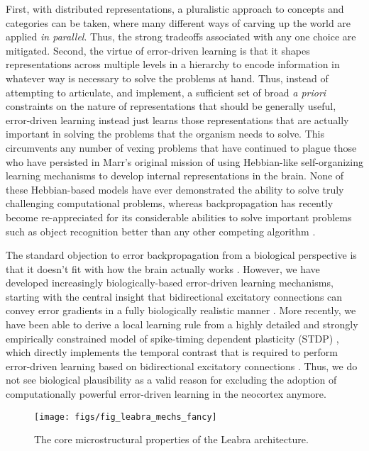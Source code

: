 \documentclass[11pt,twoside]{article}
\newif\myifpdf
\begin{document}
First, with distributed representations, a pluralistic approach to concepts and categories can be taken, where many different ways of carving up the world are applied {\em in parallel}.  Thus, the strong tradeoffs associated with any one choice are mitigated.  Second, the virtue of error-driven learning is that it shapes representations across multiple levels in a hierarchy to encode information in whatever way is necessary to solve the problems at hand.  Thus, instead of attempting to articulate, and implement, a sufficient set of broad {\em a priori} constraints on the nature of representations that should be generally useful, error-driven learning instead just learns those representations that are actually important in solving the problems that the organism needs to solve.  This circumvents any number of vexing problems that have continued to plague those who have persisted in Marr's original mission of using Hebbian-like self-organizing learning mechanisms to develop internal representations in the brain.  None of these Hebbian-based models have ever demonstrated the ability to solve truly challenging computational problems, whereas backpropagation has recently become re-appreciated for its considerable abilities to solve important problems such as object recognition better than any other competing algorithm \cite[e.g.,]{CiresanMeierGambardellaEtAl10,CiresanMeierSchmidhuber12,KrizhevskySutskeverHinton12,BengioCourvilleVincent13}.

The standard objection to error backpropagation from a biological perspective is that it doesn't fit with how the brain actually works \cite{Crick89}.  However, we have developed increasingly biologically-based error-driven learning mechanisms, starting with the central insight that bidirectional excitatory connections can convey error gradients in a fully biologically realistic manner \cite{OReilly96}.  More recently, we have been able to derive a local learning rule from a highly detailed and strongly empirically constrained model of spike-timing dependent plasticity (STDP) \cite{UrakuboHondaFroemkeEtAl08}, which directly implements the temporal contrast that is required to perform error-driven learning based on bidirectional excitatory connections \cite{OReillyMunakataFrankEtAl12}.  Thus, we do not see biological plausibility as a valid reason for excluding the adoption of computationally powerful error-driven learning in the neocortex anymore.

\begin{figure}
  \centering\texttt{[image: figs/fig\_leabra\_mechs\_fancy]}
  \caption{\small The core microstructural properties of the Leabra
    architecture.}
  \label{fig.leabra_mechs}
\end{figure}
\end{document}
